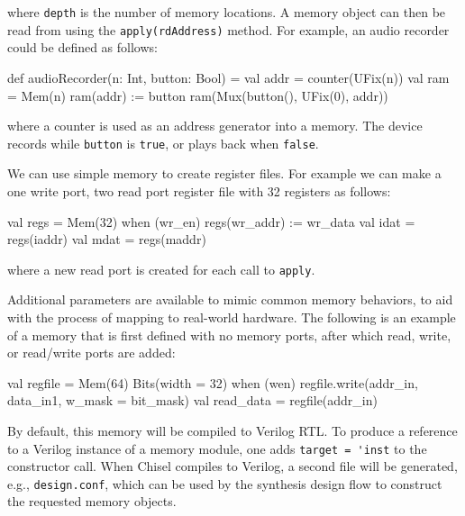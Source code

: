 \documentclass[twocolumn,10pt]{article}
\def\code#1{{\tt #1}}
\begin{document}
\noindent
where \verb+depth+ is the number of memory locations.
A memory object can then
be read from using the \verb+apply(rdAddress)+ method.  For example, an
audio recorder could be defined as follows:

\begin{scala}
  def audioRecorder(n: Int, button: Bool) = { 
    val addr   = counter(UFix(n))
    val ram    = Mem(n)
    ram(addr) := button
    ram(Mux(button(), UFix(0), addr))
  } 
\end{scala}

\noindent
where a counter is used as an address generator into a memory.  
The device records while \verb+button+ is \verb+true+, or plays back when \verb+false+.

We can use simple memory to create register files.
For example we can make a one write port, two read port register file with 32 registers as follows:

\begin{scala}
  val regs = Mem(32)
  when (wr_en) {
    regs(wr_addr) := wr_data
  }
  val idat = regs(iaddr)
  val mdat = regs(maddr)
\end{scala}

\noindent
where a new read port is created for each call to \code{apply}.

Additional parameters are available to mimic common memory behaviors,
to aid with the process of mapping to real-world hardware.  The
following is an example of a memory that is first defined with no
memory ports, after which read, write, or read/write ports are added:

\begin{scala}
  val regfile = Mem(64){ Bits(width = 32) }
  when (wen) {
    regfile.write(addr_in, data_in1, w_mask = bit_mask)
  }
  val read_data = regfile(addr_in)
\end{scala}


% 
% 
By default, this memory will be compiled to Verilog RTL.  To produce a
reference to a Verilog instance of a memory module, one adds
\verb+target = 'inst+ to the constructor call.  When Chisel compiles
to Verilog, a second file will be generated, e.g., \verb+design.conf+,
which can be used by the synthesis design flow to construct the
requested memory objects.
\end{document}

